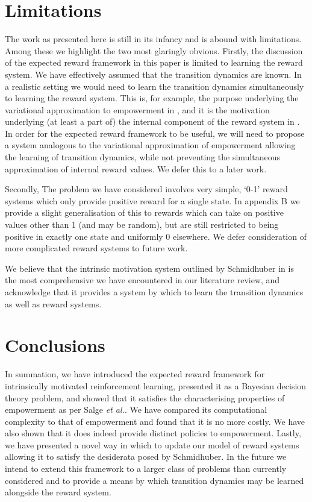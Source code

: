 \documentclass{article}
\begin{document}
\section{Limitations}
The work as presented here is still in its infancy and is abound with limitations. Among these we highlight the two most glaringly obvious. Firstly, the discussion of the expected reward framework in this paper is limited to learning the reward system. We have effectively assumed that the transition dynamics are known. In a realistic setting we would need to learn the transition dynamics simultaneously to learning the reward system. This is, for example, the purpose underlying the variational approximation to empowerment in \cite{mohamed2015variational}, and it is the motivation underlying (at least a part of) the internal component of the reward system in \cite{schmidhuber2010formal}. In order for the expected reward framework to be useful, we will need to propose a system analogous to the variational approximation of empowerment allowing the learning of transition dynamics, while not preventing the simultaneous approximation of internal reward values. We defer this to a later work.

Secondly, The problem we have considered involves very simple, `0-1' reward systems which only provide positive reward for a single state. In appendix B we provide a slight generalisation of this to rewards which can take on positive values other than 1 (and may be random), but are still restricted to being positive in exactly one state and uniformly 0 elsewhere. We defer consideration of more complicated reward systems to future work. 

We believe that the intrinsic motivation system outlined by Schmidhuber in \cite{schmidhuber2010formal} is the most comprehensive we have encountered in our literature review, and acknowledge that it provides a system by which to learn the transition dynamics as well as reward systems.

\section{Conclusions}
In summation, we have introduced the expected reward framework for intrinsically motivated reinforcement learning, presented it as a Bayesian decision theory problem, and showed that it satisfies the characterising properties of empowerment as per Salge \textit{et al.}. We have compared its computational complexity to that of empowerment and found that it is no more costly. We have also shown that it does indeed provide distinct policies to empowerment. Lastly, we have presented a novel way in which to update our model of reward systems allowing it to satisfy the desiderata posed by Schmidhuber. In the future we intend to extend this framework to a larger class of problems than currently considered and to  provide a means by which transition dynamics may be learned alongside the reward system.
\newpage
\nocite{*}


\newpage
\end{document}

